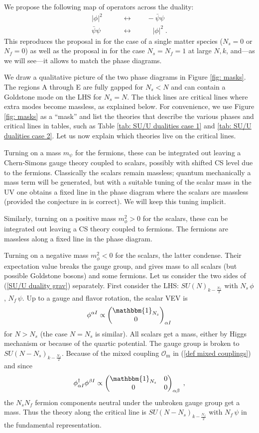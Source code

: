 \documentclass[a4paper, 12pt]{article}
\numberwithin{equation}{section}
\newcommand{\mat}[1]{\begin{pmatrix} #1 \end{pmatrix}}
\newcommand{\be}{\begin{equation}} \newcommand{\ee}{\end{equation}}
\newcommand{\bea}{\begin{equation} \begin{aligned}} \newcommand{\eea}{\end{aligned} \end{equation}}
\newcommand{\cO}{\mathcal{O}}
\newcommand{\unit}{\mathbbm{1}}
\begin{document}
We propose the following map of operators across the duality:
\bea
|\phi|^2 \qquad&\longleftrightarrow\qquad - \bar\psi\psi \\
\bar\psi\psi \qquad&\longleftrightarrow\qquad \;\;\; |\phi|^2 \;.
\eea
This reproduces the proposal in \cite{Aharony:2015mjs, Karch:2016sxi, Seiberg:2016gmd, Hsin:2016blu} for the case of a single matter species ($N_s=0$ or $N_f=0$) as well as the proposal in \cite{Jain:2013gza} for the case $N_s = N_f=1$ at large $N,k$, and---as we will see---it allows to match the phase diagrams.

We draw a qualitative picture of the two phase diagrams in Figure \ref{fig: masks}. The regions A through E are fully gapped for $N_s<N$ and can contain a Goldstone mode on the LHS for $N_s = N$. The thick lines are critical lines where extra modes become massless, as explained below. For convenience, we use Figure \ref{fig: masks} as a ``mask'' and list the theories that describe the various phases and critical lines in tables, such as Table \ref{tab: SU/U dualities case 1} and \ref{tab: SU/U dualities case 2}. Let us now explain which theories live on the critical lines.

Turning on a mass $m_\psi$ for the fermions, these can be integrated out leaving a Chern-Simons gauge theory coupled to scalars, possibly with shifted CS level due to the fermions. Classically the scalars remain massless; quantum mechanically a mass term will be generated, but with a suitable tuning of the scalar mass in the UV one obtains a fixed line in the phase diagram where the scalars are massless (provided the conjecture in \cite{Hsin:2016blu} is correct). We will keep this tuning implicit.

Similarly, turning on a positive mass $m_\phi^2>0$ for the scalars, these can be integrated out leaving a CS theory coupled to fermions. The fermions are massless along a fixed line in the phase diagram.

Turning on a negative mass $m_\phi^2<0$ for the scalars, the latter condense. Their expectation value breaks the gauge group, and gives mass to all scalars (but possible Goldstone bosons) and some fermions. Let us consider the two sides of (\ref{SU/U duality grav}) separately. First consider the LHS: $SU(N)_{k- \frac{N_f}2}$ with $N_s\,\phi$, $N_f\,\psi$. Up to a gauge and flavor rotation, the scalar VEV is
\be
\phi^{\alpha I} \propto \mat{ \unit_{N_s} \\ 0}_{\alpha I}
\ee
for $N > N_s$ (the case $N=N_s$ is similar). All scalars get a mass, either by Higgs mechanism or because of the quartic potential. The gauge group is broken to $SU(N-N_s)_{k - \frac{N_f}2}$. Because of the mixed coupling $\cO_\text{m}$ in (\ref{def mixed couplings}) and since
\be
\phi^\dag_{\alpha I} \phi^{\beta I} \propto \mat{ \unit_{N_s} & 0 \\ 0 & 0}_{\alpha\beta} \;,
\ee
the $N_s N_f$ fermion components neutral under the unbroken gauge group get a mass. Thus the theory along the critical line is $SU(N-N_s)_{k - \frac{N_f}2}$ with $N_f\,\psi$ in the fundamental representation.
\end{document}
